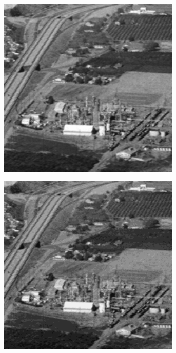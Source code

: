 \begin{figure}
\begin{subfigure}[b]{.23\textwidth}
  \caption{}
  \label{fig:test-images-chemicalplant-truncate1}
\end{subfigure}
\begin{subfigure}[b]{.23\textwidth}
  \centering
  \includegraphics[width=0.95\textwidth]{figures/test-images/truncate2/chemicalplant}
  \caption{}
  \label{fig:test-images-chemicalplant-truncate2}
\end{subfigure}
\begin{subfigure}[b]{.23\textwidth}
  \centering
  \includegraphics[width=0.95\textwidth]{figures/test-images/truncate4/chemicalplant}
  \caption{}
  \label{fig:test-images-chemicalplant-truncate4}
\end{subfigure}


\end{figure}
